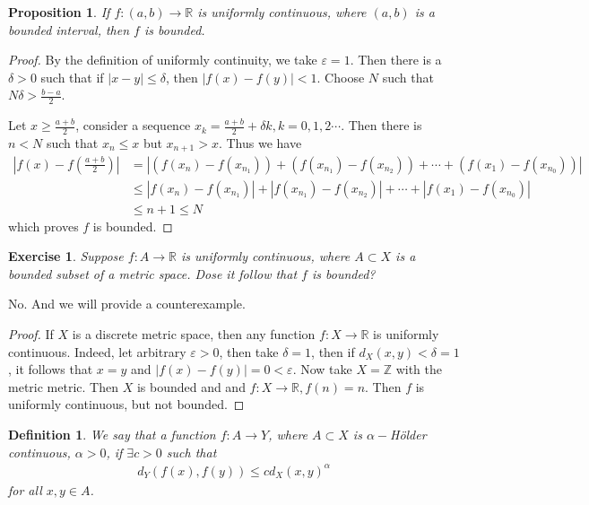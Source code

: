 \documentclass[12pt,leqno]{amsart}
\newtheorem{definition}{Definition}[section]
\newtheorem{proposition}{Proposition}[section]
\newtheorem{exercise}{Exercise}[section]
\theoremstyle{definition}
\numberwithin{equation}{subsection}
\begin{document}
\medskip

\begin{proposition}
If $f:(a,b)\to \mathbb{R}$ is uniformly continuous, where $(a,b)$ is a bounded interval, then $f$ is bounded.
\end{proposition}
\begin{proof}
By the definition of uniformly continuity, we take $\varepsilon = 1$. Then there is a $\delta > 0$ such that if $|x-y|\leq\delta$, then $|f(x)-f(y)| < 1$. Choose $N$ such that $N\delta > \frac{b-a}{2}$. 

Let $x\geq \frac{a+b}{2}$, consider a sequence $x_k = \frac{a+b}{2}+\delta k, k=0,1,2\cdots$. Then there is $n<N$ such that $x_n \leq x$ but $x_{n+1}>x$. Thus we have 
\begin{align*}
    \left|f(x) - f\left(\frac{a+b}{2}\right)\right| & = \left|(f(x_n)-f(x_{n_1})) + (f(x_{n_1})-f(x_{n_2})) + \cdots + (f(x_1)-f(x_{n_0}))\right| \\
    & \leq \left|f(x_n)-f(x_{n_1})\right|  + \left|f(x_{n_1})-f(x_{n_2})\right| + \cdots + \left|f(x_1)-f(x_{n_0})\right| \\
    & \leq n+1 \leq N
\end{align*}
which proves $f$ is bounded. 
\end{proof}

\begin{exercise}
Suppose $f:A\to \mathbb{R}$ is uniformly continuous, where $A\subset X$ is a bounded subset of a metric space. Dose it follow that $f$ is bounded? 
\end{exercise}

No. And we will provide a counterexample. 

\begin{proof}
If $X$ is a discrete metric space, then any function $f:X\to\mathbb{R}$ is uniformly continuous. Indeed, let arbitrary $\varepsilon > 0$, then take $\delta = 1$, then if $d_X(x,y)< \delta = 1$, it follows that $x = y$ and $|f(x)-f(y)| = 0 < \varepsilon$. 
Now take $X = \mathbb{Z}$ with the metric metric. Then $X$ is bounded and and $f:X\to \mathbb{R}, f(n) = n$. Then $f$ is uniformly continuous, but not bounded.
\end{proof}

\medskip

\begin{definition}
We say that a function $f:A\to Y$, where $A\subset X$ is $\alpha-$Hölder continuous, $\alpha > 0$, if $\exists c > 0$ such that
\begin{align*}
    d_Y(f(x),f(y))\leq c d_X(x,y)^\alpha
\end{align*}
for all $x,y\in A$.
\end{definition}
\end{document}

